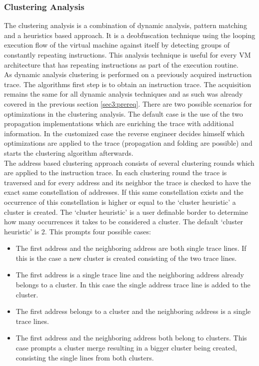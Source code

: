 \documentclass[10pt,twoside,a4paper,bibliography=totoc]{scrbook}
\begin{document}
\subsubsection{Clustering Analysis}
The clustering analysis is a combination of dynamic analysis, pattern matching and a heuristics based approach. It is a deobfuscation technique using the looping execution flow of the virtual machine against itself by detecting groups of constantly repeating instructions. This analysis technique is useful for every VM architecture that has repeating instructions as part of the execution routine. \\
As dynamic analysis clustering is performed on a previously acquired instruction trace. The algorithms first step is to obtain an instruction trace.
The acquisition remains the same for all dynamic analysis techniques and as such was already covered in the previous section \ref{sec3:prereq}.
There are two possible scenarios for optimizations in the clustering analysis. The default case is the use of the two propagation implementations which are enriching the trace with additional information. In the customized case the reverse engineer decides himself which optimizations are applied to the trace (propagation and folding are possible) and starts the clustering algorithm afterwards.\\
The address based clustering approach consists of several clustering rounds which are applied to the instruction trace.
In each clustering round the trace is traversed and for every address and its neighbor the trace is checked to have the exact same constellation of addresses. If this same constellation exists and the occurrence of this constellation is higher or equal to the `cluster heuristic' a cluster is created. The `cluster heuristic' is a user definable border to determine how many occurrences it takes to be considered a cluster. The default `cluster heuristic' is 2.
This prompts four possible cases:
\begin{itemize}
\item{The first address and the neighboring address are both single trace lines.}
If this is the case a new cluster is created consisting of the two trace lines. 
\item{The first address is a single trace line and the neighboring address already belongs to a cluster.} In this case the single address trace line is added to the cluster.
\item{The first address belongs to a cluster and the neighboring address is a single trace lines.}
\item{The first address and the neighboring address both belong to clusters.} This case prompts a cluster merge resulting in a bigger cluster being created, consisting the single lines from both clusters.
\end{itemize} 
\end{document}
